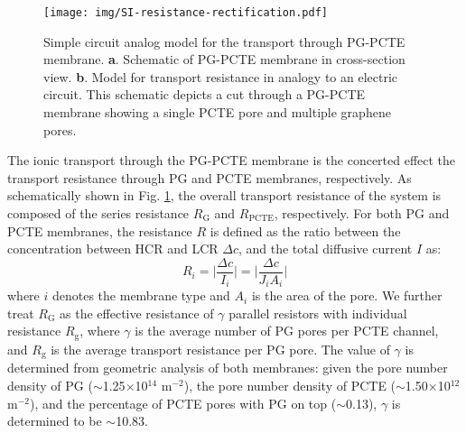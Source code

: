 \documentclass[manuscript=suppinfo,email=true, hyperref=true, keywords=false]{achemso}
\newcommand{\Fig}{Fig.}
\begin{document}
\begin{figure}[htbp]
  \centering
  \texttt{[image: img/SI-resistance-rectification.pdf]}
  \caption{Simple circuit analog model for the transport through
    PG-PCTE membrane. \textbf{a}. Schematic of PG-PCTE membrane in
    cross-section view. \textbf{b}. Model for transport resistance in
    analogy to an electric circuit. This schematic depicts a cut
    through a PG-PCTE membrane showing a single PCTE pore and multiple
    graphene pores.}
  \label{fig:R-model}
\end{figure}
The ionic transport through the PG-PCTE membrane is the concerted
effect the transport resistance through PG and PCTE membranes,
respectively. As schematically shown in \Fig{} \ref{fig:R-model}, the
overall transport resistance of the system is composed of the series
resistance $R_{\mathrm{G}}$ and $R_{\mathrm{PCTE}}$, respectively. For
both PG and PCTE membranes, the resistance $R$ is defined as the ratio
between the concentration between HCR and LCR $\Delta c$, and the total diffusive current $I$ as:
\begin{equation}
\label{eq:1}
R_{i} = \Bigg|\frac{\Delta c}{I_{i}}\Bigg| =  \Bigg|\frac{\Delta c}{J_{i}A_{i}}\Bigg|
\end{equation}
where $i$ denotes the membrane type and $A_{i}$ is the area of the
pore. We further treat $R_{\mathrm{G}}$ as the effective resistance of
$\gamma$ parallel resistors with individual resistance
$R_{\mathrm{g}}$, where $\gamma$ is the average number of PG pores per
PCTE channel, and $R_{\mathrm{g}}$ is the average transport resistance
per PG pore. The value of $\gamma$ is determined from geometric
analysis of both membranes: given the pore number density of PG
($\sim$1.25$\times$10$^{14}$ m$^{-2}$), the pore number density of
PCTE ($\sim$1.50$\times$10$^{12}$ m$^{-2}$), and the percentage of
PCTE pores with PG on top ($\sim$0.13), $\gamma$ is determined to be
$\sim$10.83.
\end{document}
